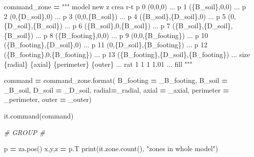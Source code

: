 \documentclass[a4paper, nobind]{templates/ociamthesis}
\newenvironment{Shaded}{\begin{snugshade}}{\end{snugshade}}
\newcommand{\BuiltInTok}[1]{#1}
\newcommand{\CommentTok}[1]{\textcolor[rgb]{0.56,0.35,0.01}{\textit{#1}}}
\newcommand{\NormalTok}[1]{#1}
\newcommand{\OperatorTok}[1]{\textcolor[rgb]{0.81,0.36,0.00}{\textbf{#1}}}
\newcommand{\SpecialCharTok}[1]{\textcolor[rgb]{0.00,0.00,0.00}{#1}}
\newcommand{\StringTok}[1]{\textcolor[rgb]{0.31,0.60,0.02}{#1}}
\renewenvironment{Shaded}
{
  \vspace{10pt}%
  \begin{snugshade}%
}{%
  \end{snugshade}%
  \vspace{8pt}%
}
\begin{document}
\begin{Shaded}
\begin{Highlighting}[]
\NormalTok{command\_zone }\OperatorTok{=} \StringTok{"""}
\StringTok{model new}
\StringTok{z crea r{-}t p 0 (0,0,0) ...}
\StringTok{           p 1 (}\SpecialCharTok{\{B\_soil\}}\StringTok{,0,0) ... }
\StringTok{           p 2 (0,}\SpecialCharTok{\{D\_soil\}}\StringTok{,0) ...}
\StringTok{           p 3 (0,0,}\SpecialCharTok{\{B\_soil\}}\StringTok{) ...}
\StringTok{           p 4 (}\SpecialCharTok{\{B\_soil\}}\StringTok{,}\SpecialCharTok{\{D\_soil\}}\StringTok{,0) ...}
\StringTok{           p 5 (0,}\SpecialCharTok{\{D\_soil\}}\StringTok{,}\SpecialCharTok{\{B\_soil\}}\StringTok{) ...}
\StringTok{           p 6 (}\SpecialCharTok{\{B\_soil\}}\StringTok{,0,}\SpecialCharTok{\{B\_soil\}}\StringTok{) ...}
\StringTok{           p 7 (}\SpecialCharTok{\{B\_soil\}}\StringTok{,}\SpecialCharTok{\{D\_soil\}}\StringTok{,}\SpecialCharTok{\{B\_soil\}}\StringTok{) ...}
\StringTok{           p 8 (}\SpecialCharTok{\{B\_footing\}}\StringTok{,0,0) ...}
\StringTok{           p 9 (0,0,}\SpecialCharTok{\{B\_footing\}}\StringTok{) ...}
\StringTok{           p 10 (}\SpecialCharTok{\{B\_footing\}}\StringTok{,}\SpecialCharTok{\{D\_soil\}}\StringTok{,0) ...}
\StringTok{           p 11 (0,}\SpecialCharTok{\{D\_soil\}}\StringTok{,}\SpecialCharTok{\{B\_footing\}}\StringTok{) ...}
\StringTok{           p 12 (}\SpecialCharTok{\{B\_footing\}}\StringTok{,0,}\SpecialCharTok{\{B\_footing\}}\StringTok{) ...}
\StringTok{           p 13 (}\SpecialCharTok{\{B\_footing\}}\StringTok{,}\SpecialCharTok{\{D\_soil\}}\StringTok{,}\SpecialCharTok{\{B\_footing\}}\StringTok{) ...}
\StringTok{           size }\SpecialCharTok{\{radial\}}\StringTok{ }\SpecialCharTok{\{axial\}}\StringTok{ }\SpecialCharTok{\{perimeter\}}\StringTok{ }\SpecialCharTok{\{outer\}}\StringTok{ ...}
\StringTok{           rat 1 1 1 1.01 ...}
\StringTok{           fill}
\StringTok{"""}

\NormalTok{command }\OperatorTok{=}\NormalTok{ command\_zone.}\BuiltInTok{format}\NormalTok{(}
\NormalTok{B\_footing }\OperatorTok{=}\NormalTok{ \_B\_footing,}
\NormalTok{B\_soil }\OperatorTok{=}\NormalTok{ \_B\_soil,}
\NormalTok{D\_soil }\OperatorTok{=}\NormalTok{ \_D\_soil,}
\NormalTok{radial}\OperatorTok{=}\NormalTok{\_radial,}
\NormalTok{axial }\OperatorTok{=}\NormalTok{ \_axial,}
\NormalTok{perimeter }\OperatorTok{=}\NormalTok{ \_perimeter,}
\NormalTok{outer }\OperatorTok{=}\NormalTok{ \_outer)}

\NormalTok{it.command(command)}

\CommentTok{\# GROUP \#}

\NormalTok{p }\OperatorTok{=}\NormalTok{ za.pos()}
\NormalTok{x,y,z }\OperatorTok{=}\NormalTok{ p.T}
\BuiltInTok{print}\NormalTok{(it.zone.count(), }\StringTok{"zones in whole model"}\NormalTok{)}


\end{Highlighting}
\end{Shaded}
\end{document}
